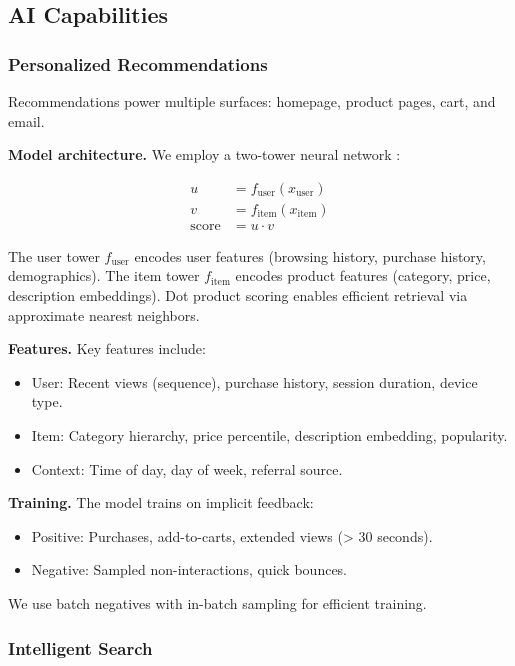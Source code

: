 \subsection{AI Capabilities}

\subsubsection{Personalized Recommendations}

Recommendations power multiple surfaces: homepage, product pages, cart, and email.

\textbf{Model architecture.} We employ a two-tower neural network \cite{youtube2016}:

\begin{align}
u &= f_{\text{user}}(x_{\text{user}}) \\
v &= f_{\text{item}}(x_{\text{item}}) \\
\text{score} &= u \cdot v
\end{align}

The user tower $f_{\text{user}}$ encodes user features (browsing history, purchase history, demographics). The item tower $f_{\text{item}}$ encodes product features (category, price, description embeddings). Dot product scoring enables efficient retrieval via approximate nearest neighbors.

\textbf{Features.} Key features include:
\begin{itemize}
\item User: Recent views (sequence), purchase history, session duration, device type.
\item Item: Category hierarchy, price percentile, description embedding, popularity.
\item Context: Time of day, day of week, referral source.
\end{itemize}

\textbf{Training.} The model trains on implicit feedback:
\begin{itemize}
\item Positive: Purchases, add-to-carts, extended views (> 30 seconds).
\item Negative: Sampled non-interactions, quick bounces.
\end{itemize}

We use batch negatives with in-batch sampling for efficient training.

\subsubsection{Intelligent Search}

